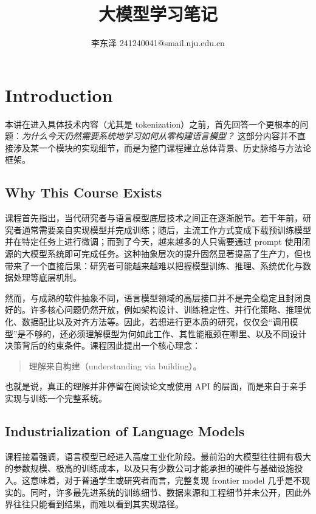 \documentclass[a4paper,UTF8]{article}
\numberwithin{equation}{section}
\begin{document}
\title{大模型学习笔记}
\author{李东泽 241240041@smail.nju.edu.cn}
\maketitle
\tableofcontents
\newpage
\section{Introduction}

本讲在进入具体技术内容（尤其是 tokenization）之前，首先回答一个更根本的问题：\emph{为什么今天仍然需要系统地学习如何从零构建语言模型？} 这部分内容并不直接涉及某一个模块的实现细节，而是为整门课程建立总体背景、历史脉络与方法论框架。

\subsection{Why This Course Exists}

课程首先指出，当代研究者与语言模型底层技术之间正在逐渐脱节。若干年前，研究者通常需要亲自实现模型并完成训练；随后，主流工作方式变成下载预训练模型并在特定任务上进行微调；而到了今天，越来越多的人只需要通过 prompt 使用闭源的大模型系统即可完成任务。这种抽象层次的提升固然显著提高了生产力，但也带来了一个直接后果：研究者可能越来越难以把握模型训练、推理、系统优化与数据处理等底层机制。

然而，与成熟的软件抽象不同，语言模型领域的高层接口并不是完全稳定且封闭良好的。许多核心问题仍然开放，例如架构设计、训练稳定性、并行化策略、推理优化、数据配比以及对齐方法等。因此，若想进行更本质的研究，仅仅会“调用模型”是不够的，还必须理解模型为何如此工作、其性能瓶颈在哪里、以及不同设计决策背后的约束条件。课程因此提出一个核心理念：
\begin{quote}
理解来自构建（understanding via building）。
\end{quote}
也就是说，真正的理解并非停留在阅读论文或使用 API 的层面，而是来自于亲手实现与训练一个完整系统。

\subsection{Industrialization of Language Models}

课程接着强调，语言模型已经进入高度工业化阶段。最前沿的大模型往往拥有极大的参数规模、极高的训练成本，以及只有少数公司才能承担的硬件与基础设施投入。这意味着，对于普通学生或研究者而言，完整复现 frontier model 几乎是不现实的。同时，许多最先进系统的训练细节、数据来源和工程细节并未公开，因此外界往往只能看到结果，而难以看到其实现路径。
\end{document}
